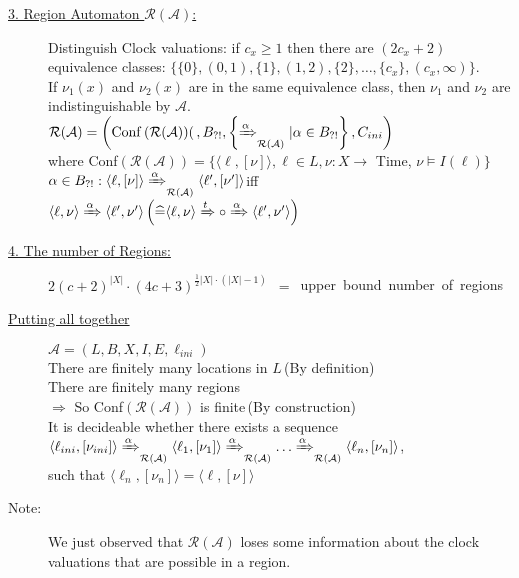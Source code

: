 \begin{tcolorbox}[colback=kapiteleins!5!white, colframe=orange!75!black, title=\textbf{Location Reachability / The Region Automata}, left=0mm, right=0mm, top=0mm, bottom=0mm]
\begin{description}
\item[\uline{3. Region Automaton $\mathcal{R}(\mathcal{A})$:}] \hfill \newline
Distinguish Clock valuations: if $c_x \geq 1$ then there are $(2 c_x + 2)$ equivalence classes: \hfill $\{\{0\}, (0,1), \{1\}, (1,2), \{2\}, \ldots, \{c_x\}, (c_x, \infty)\}.$\\
If $\nu_1(x)$ and $\nu_2(x)$ are in the same equivalence class, then $\nu_1$ and $\nu_2$ are indistinguishable by $\mathcal{A}$.\\
$\mathcal{R}(\mathcal{A}) = \left(\mathrm{Conf} \left( \mathcal{R}(\mathcal{A}))\right(, B_{?!}, \left\{ \xRightarrow{\alpha}_{\mathcal{R}(\mathcal{A})} \vert \alpha \in B_{?!} \right\}, C_{ini} \right)$\\
where Conf$\left( \mathcal{R}(\mathcal{A}) \right) = \{ \langle \ell, [\nu] \rangle , \ell \in L, \nu : X \rightarrow$ Time, $\nu \models I(\ell)\}$\\
\mbox{$\alpha \in B_{?!}: \langle \ell, [\nu] \rangle \xRightarrow{\alpha}_{\mathcal{R}(\mathcal{A})} \langle \ell', [\nu'] \rangle$\hfill iff $\langle \ell, \nu \rangle \xRightarrow{\alpha} \langle \ell', \nu' \rangle \hfill \left(\widehat{=} \langle \ell, \nu \rangle \xRightarrow{t} \circ \xRightarrow{\alpha} \langle \ell', \nu' \rangle \right)$}

\item[\uline{4. The number of Regions:}] \mbox{$2 \left( c + 2 \right)^{\vert X \vert} \cdot \left( 4c + 3 \right)^{\frac{1}{2} \vert X \vert \cdot \left( \vert X \vert - 1 \right)}$ $=$ upper bound number of regions}
\item[\uline{Putting all together}] $\mathcal{A} = \left( L, B, X, I, E, \ell_{ini} \right)$\\
There are finitely many locations in $L$\,(By definition)\\
There are finitely many regions\\
$\Rightarrow$ So Conf$\left( \mathcal{R}(\mathcal{A}) \right)$ is finite\,(By construction)\\
It is decideable whether there exists a sequence\\
$\langle \ell_{ini}, [\nu_{ini}] \rangle \xRightarrow{\alpha}_{\mathcal{R}(\mathcal{A})} \langle \ell_1, [\nu_1] \rangle \xRightarrow{\alpha}_{\mathcal{R}(\mathcal{A})} \ldots \xRightarrow{\alpha}_{\mathcal{R}(\mathcal{A})} \langle \ell_n, [\nu_n] \rangle$,\\
such that $\langle \ell_n, [\nu_n] \rangle = \langle \ell, [\nu] \rangle$
\item[Note:] We just observed that $\mathcal{R}(\mathcal{A})$ loses some information about the clock valuations that are possible in a region.
\end{description}
\end{tcolorbox}

